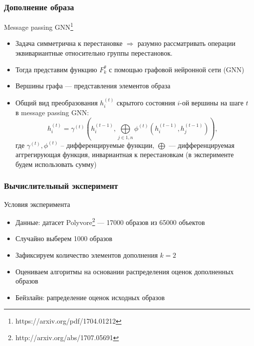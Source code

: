 \documentclass[10pt]{beamer}
\begin{document}
\begin{frame}
	\frametitle{Дополнение образа}
	\begin{block}{Message passing GNN\footnote{https://arxiv.org/pdf/1704.01212}}
		\begin{itemize}
			\item  Задача симметрична к перестановке $\Longrightarrow$ разумно рассматривать операции эквивариантные относительно группы перестановок.
			\item Тогда представим функцию $F_k^\theta$ с помощью графовой нейронной сети (GNN)
			\item Вершины графа --- представления элементов образа
			\item Общий вид преобразования $h_i^{(t)}$ скрытого состояния $i$-ой вершины на шаге $t$ в message passing GNN:
			$$h_i^{(t)} = \gamma^{(t)} \left(h_i^{(t-1)}, \bigoplus\limits_{j\in \overline{1, n}}\phi^{(t)} \left(h_i^{(t-1)}, h_j^{(t-1)} \right) \right),$$
			где $\gamma^{(t)}, \phi^{(t)}$ -- дифференцируемые функции, $\bigoplus$ --- дифференцируемая аггрегирующая функция, инвариантная к перестановкам (в эксперименте будем использовать сумму)
		\end{itemize}
	\end{block}
\end{frame}


\begin{frame}
	\frametitle{Вычислительный эксперимент}
	\begin{block}{Условия эксперимента}
		\begin{itemize}
			\item Данные: датасет Polyvore\footnote{http://arxiv.org/abs/1707.05691} --- 17000 образов из 65000 объектов
			\item Случайно выберем 1000 образов 
			\item Зафиксируем количество элементов дополнения $k=2$
			\item Оцениваем алгоритмы на основании распределения оценок дополненных образов
			\item Бейзлайн: рапределение оценок исходных образов
		\end{itemize}
	\end{block}
\end{frame}
\end{document}
